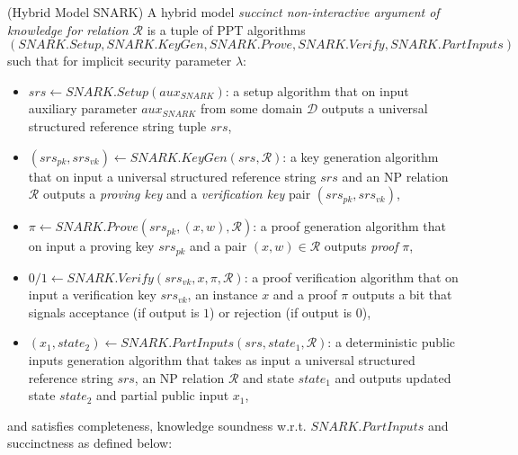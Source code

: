 \begin{definition}(Hybrid Model SNARK)
\label{dfn_snark}
A hybrid model \emph{succinct non-interactive argument of knowledge for relation $\mathcal{R}$} is a tuple of PPT algorithms 
$(\mathit{SNARK.Setup}, \mathit{SNARK.KeyGen}, \mathit{SNARK.Prove},  \mathit{SNARK.Verify}, \mathit{SNARK.PartInputs})$ 
such that for implicit security parameter $\lambda$: 

\begin{itemize}
\item $\mathit{srs} \leftarrow \mathit{SNARK.Setup} (\mathit{aux_{\mathit{SNARK}}})$: a setup algorithm that on input auxiliary parameter 
$\mathit{aux_{\mathit{SNARK}}}$ from some domain $\mathcal{D}$ outputs a universal structured reference string tuple $\mathit{srs}$, 

\item $(\mathit{srs_{pk}}, \mathit{srs_{vk}}) \leftarrow \mathit{SNARK.KeyGen}(\mathit{srs}, \mathcal{R})$: a key generation algorithm that on input a
universal structured reference string $\mathit{srs}$ and an NP relation $\mathcal{R}$ outputs a \emph{proving key} and 
a \emph{verification key} pair $(\mathit{srs_{pk}}, \mathit{srs_{vk}})$,

\item $\pi \leftarrow \mathit{SNARK.Prove}(\mathit{srs_{pk}}, (x,w), \mathcal{R})$: a proof generation algorithm that on input a proving key 
$\mathit{srs_{pk}}$ and a pair $(x,w) \in \mathcal{R}$ outputs \emph{proof} $\pi$, 

\item $0/1 \leftarrow \mathit{SNARK.Verify}(\mathit{srs_{vk}}, x, \pi, \mathcal{R})$: a proof verification algorithm that on input a verification key 
$\mathit{srs_{vk}}$, an instance $x$ and a proof $\pi$ outputs a bit that signals acceptance (if output is $1$) or rejection (if output is $0$),

\item $(x_1, \mathit{state}_2) \leftarrow \mathit{SNARK.PartInputs}(\mathit{srs}, \mathit{state}_1, \mathcal{R})$: a deterministic 
public inputs generation algorithm that takes as input a universal structured reference string $\mathit{srs}$, an NP relation $\mathcal{R}$ and 
 state $\mathit{state}_1$ and outputs updated state $\mathit{state}_2$ and partial public input $x_1$,

\end{itemize}
and satisfies completeness, knowledge soundness w.r.t. $\mathit{SNARK.PartInputs}$ and succinctness as defined below:


\end{definition}
